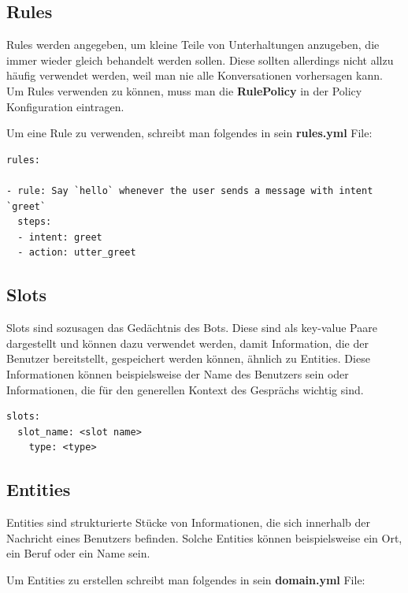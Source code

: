 \subsection{Rules}

Rules werden angegeben, um kleine Teile von Unterhaltungen anzugeben, die immer wieder gleich behandelt werden sollen.
Diese sollten allerdings nicht allzu häufig verwendet werden, weil man nie alle Konversationen vorhersagen kann.
Um Rules verwenden zu können, muss man die \textbf{RulePolicy} in der Policy Konfiguration eintragen.
\cite{rules}

Um eine Rule zu verwenden, schreibt man folgendes in sein \textbf{rules.yml} File:

\begin{lstlisting}[label={lst: Rules Example}]
rules:

- rule: Say `hello` whenever the user sends a message with intent `greet`
  steps:
  - intent: greet
  - action: utter_greet
\end{lstlisting}



\subsection{Slots}

Slots sind sozusagen das Gedächtnis des Bots.
Diese sind als key-value Paare dargestellt und können dazu verwendet werden, damit Information, die der Benutzer bereitstellt, gespeichert werden können, ähnlich zu Entities.
Diese Informationen können beispielsweise der Name des Benutzers sein oder Informationen, die für den generellen Kontext des Gesprächs wichtig sind.
\cite{slots}

\begin{lstlisting}[label={lst: Slot Example}]
slots:
  slot_name: <slot name>
    type: <type>
\end{lstlisting}


\subsection{Entities}

Entities sind strukturierte Stücke von Informationen, die sich innerhalb der Nachricht eines Benutzers befinden.
Solche Entities können beispielsweise ein Ort, ein Beruf oder ein Name sein.\cite{entities}

Um Entities zu erstellen schreibt man folgendes in sein \textbf{domain.yml} File:

